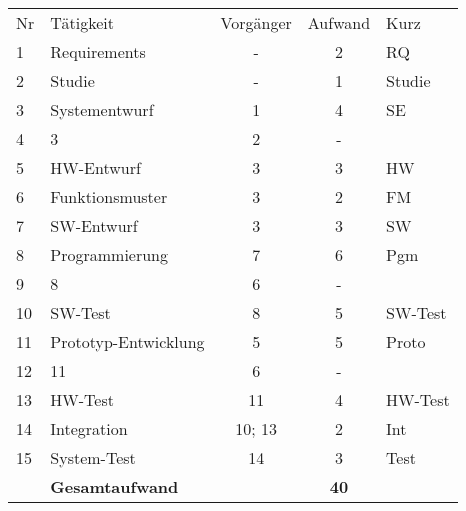 \documentclass{beamer}
\begin{document}
\begin{frame}[t,shrink=65]
\begin{center}
{\large
    \begin{tabular}{l|lccl}
      \hline
      Nr & Tätigkeit        & Vorgänger & Aufwand & Kurz \\
      1  & Requirements     & -     & 2 & RQ \\
      2  & Studie           & -     & 1 & Studie \\
      3  & Systementwurf    & 1     & 4 & SE \\
      4  &   3              & 2     & - & \\
      5  & HW-Entwurf       & 3     & 3 & HW \\
      6  & Funktionsmuster  & 3     & 2 & FM \\
      7  & SW-Entwurf       & 3     & 3 & SW \\
      8  & Programmierung   & 7     & 6 & Pgm \\
      9  & 8                & 6     & - & \\
      10 & SW-Test          & 8     & 5 & SW-Test \\
      11 & Prototyp-Entwicklung & 5 & 5 & Proto \\
      12 & 11               & 6     & - & \\
      13 & HW-Test          & 11    & 4 & HW-Test \\
      14 & Integration      & 10; 13 & 2 & Int \\
      15 & System-Test      & 14    & 3 & Test \\
      \hline
        & \textbf{Gesamtaufwand} &   & \textbf{40} \\
    \end{tabular}
}
\end{center}
\begin{frame}
\end{frame}

\end{frame}
\end{document}
